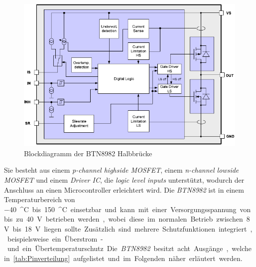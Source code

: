 \begin{figure} [H]
	\centering
	\includegraphics[width=0.5\linewidth]{Bilder/btn8982.pdf}
	\caption{Blockdiagramm der BTN8982 Halbbrücke \cite[S.4]{btn}}
	\label{fig:btn8982}
\end{figure}\noindent
Sie besteht aus einem \textit{p-channel highside MOSFET}, einem \textit{n-channel lowside MOSFET} und einem \textit{Driver IC}, die \textit{logic level inputs} unterstützt, wodurch der Anschluss an einen Microcontroller erleichtert wird. Die \textit{BTN8982} ist in einem Temperaturbereich von \SI{-40}{^\circ C} bis \SI{150}{^\circ C} einsetzbar und kann mit einer Versorgungsspannung von bis zu \SI{40}{V} betrieben werden, wobei diese im normalen Betrieb zwischen \SI{8}{V} bis \SI{18}{V} liegen sollte. Zusätzlich sind mehrere Schutzfunktionen integriert, beispielsweise ein Überstrom- und ein Übertemperaturschutz. Die \textit{BTN8982} besitzt acht Ausgänge, welche in \autoref{tab:Pinverteilung} aufgelistet und im Folgenden näher erläutert werden.

